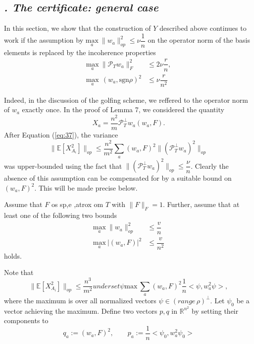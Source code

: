 \documentclass{article}
\begin{document}
\subsection{\textit{\uppercase\expandafter{}. The certificate: general case}}

In this section, we show that the construction of $Y$ described above continues to work if the assumption by $\underset{a} {\mathrm{max}} ~\|w_a\|_{op}^2 \le \nu \dfrac{1}{n}$ on the operator norm of the basis elements is replaced by the incoherence properties 
\begin{align*}
\underset{a} {\mathrm{max}} ~\|\mathcal{P}_Tw_a\|_F^2 &\le 2\nu \dfrac{r}{n},\\
\underset{a} {\mathrm{max}} ~~(w_a,\text{sgn}\rho)^2 &\le \nu\dfrac{r}{n^2}
\end{align*}

Indeed, in the discussion of the golfing scheme, we reffered to the operator norm of $w_a$ exactly once. In the proof of Lemma 7, we considered the quantity
\begin{equation}
X_a = \dfrac{n^2}{m}\mathcal{P}_T^\perp w_a(w_a, F).
\end{equation}
After Equation (\ref{eq:37}), the variance
\[
\|\mathbb{E}[X_{A_i}^2]\|_{op} \le \dfrac{n^2}{m^2}\sum_a(w_a,F)^2\|(\mathcal{P}_T^\perp w_a)^2\|_{op}
\]
was upper-bounded using the fact that $\|(\mathcal{P}_T^\perp w_a)^2\|_{op} \le \dfrac{\nu}{n}$. Clearly the absence of this assumption can be compensated for by a suitable bound on $(w_a,F)^2$. This will be made precise below.

Assume that $F$ os sp,e ,atrox om $T$ with $\|F\|_F = 1$. Further, assume that at least one of the following two bounds
\begin{align}
\underset{a} {\mathrm{max}} ~\|w_a\|_{op}^2 & \le \dfrac{v}{n}\\
\underset{a} {\mathrm{max}} ~|(w_a,F)|^2 & \le \dfrac{v}{n^2}
\end{align}
holds.

Note that
\begin{equation}
\|\mathbb{E}[X_{A_i}^2]\|_{op} \le \dfrac{n^3}{m^2}underset{\psi} {\mathrm{max}} ~\sum_a(w_a,F)^2\dfrac{1}{n}<\psi,w_a^2\psi>,
\label{eq:43}
\end{equation}
where the maximum is over all normalized vectors $\psi \in (range  \, \rho)^\perp$. Let $\psi_0$ be a vector achieving the maximum. Define two vectors $p,q$ in $\mathbb{R}^{n^2}$ by setting their components to 
\begin{equation}
q_a := (w_a,F)^2, \qquad p_a := \dfrac{1}{n}<\psi_0,w_a^2\psi_0>
\label{eq:44}
\end{equation}
\end{document}
